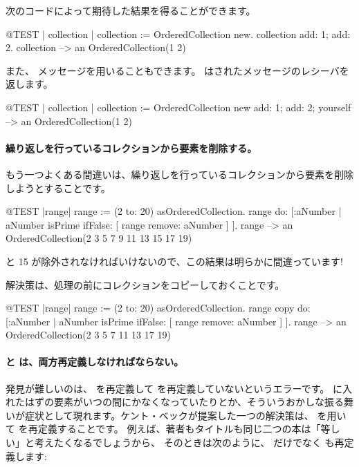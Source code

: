 \documentclass[a4paper,10pt,twoside]{book}
\begin{document}
次のコードによって期待した結果を得ることができます。
\begin{code}{@TEST | collection |}
collection := OrderedCollection new.
collection add: 1; add: 2.
collection --> an OrderedCollection(1 2)
\end{code}

また、 メッセージを用いることもできます。 はされたメッセージのレシーバを返します。

\begin{code}{@TEST | collection |}
collection := OrderedCollection new add: 1; add: 2; yourself --> an OrderedCollection(1 2)
\end{code}

\paragraph{繰り返しを行っているコレクションから要素を削除する。} もう一つよくある間違いは、繰り返しを行っているコレクションから要素を削除しようとすることです。
\begin{code}{@TEST |range|}
range := (2 to: 20) asOrderedCollection.
range do: [:aNumber | aNumber isPrime ifFalse: [ range remove: aNumber ] ].
range --> an OrderedCollection(2 3 5 7 9 11 13 15 17 19)
\end{code}
 と 15 が除外されなければいけないので、この結果は明らかに間違っています!

解決策は、処理の前にコレクションをコピーしておくことです。
\begin{code}{@TEST |range|}
range := (2 to: 20) asOrderedCollection.
range copy do: [:aNumber | aNumber isPrime ifFalse: [ range remove: aNumber ] ].
range --> an OrderedCollection(2 3 5 7 11 13 17 19)
\end{code}

\paragraph{\ct{=} と  は、両方再定義しなければならない。}
発見が難しいのは、\ct{=} を再定義して を再定義していないというエラーです。 に入れたはずの要素がいつの間にかなくなっていたりとか、そういうおかしな振る舞いが症状として現れます。ケント・ベックが提案した一つの解決策は、 を用いて  を再定義することです。
例えば、著者もタイトルも同じ二つの本は「等しい」と考えたくなるでしょうから、
そのときは次のように、\ct{=} だけでなく  も再定義します:
\end{document}
